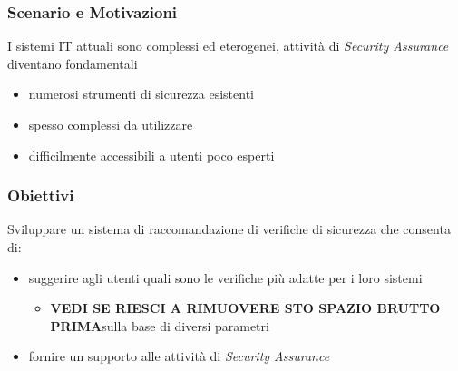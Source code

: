 \frame{\titlepage}

\begin{frame}
    \frametitle{Scenario e Motivazioni}
    I sistemi IT attuali sono \alert{complessi} ed \alert{eterogenei}, attività di \alert{\textit{Security Assurance}} diventano fondamentali

    \begin{itemize}
        \item numerosi strumenti di sicurezza esistenti
        \item spesso \alert{complessi} da utilizzare
        \item difficilmente accessibili a utenti poco esperti
    \end{itemize}
\end{frame}

\begin{frame}
    \frametitle{Obiettivi}
    Sviluppare un \alert{sistema di raccomandazione} di \alert{verifiche di sicurezza} che consenta di:
    \begin{itemize}
        \item suggerire agli utenti quali sono le verifiche \alert{più adatte} per i loro sistemi
        \begin{itemize}
            \item \textbf{VEDI SE RIESCI A RIMUOVERE STO SPAZIO BRUTTO PRIMA}sulla base di diversi parametri
        \end{itemize}
        \item fornire un \alert{supporto} alle \alert{attività di \textit{Security Assurance}}
    \end{itemize}

\end{frame}

